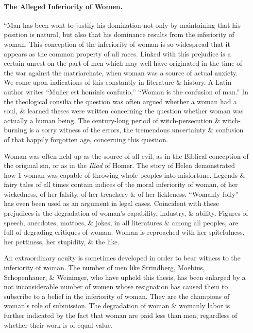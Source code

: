 \documentclass{article}
\begin{document}
\paragraph{The Alleged Inferiority of Women.} ``Man has been wont to justify his domination not only by maintaining that his position is natural, but also that his dominance results from the inferiority of woman. This conception of the inferiority of woman is so widespread that it appears as the common property of all races. Linked with this prejudice is a certain unrest on the part of men which may well have originated in the time of the war against the matriarchate, when woman was a source of actual anxiety. We come upon indications of this constantly in literature \& history. A Latin author writes ``Mulier est hominis confusio,'' ``Woman is the confusion of man.'' In the theological consilia the question was often argued whether a woman had a soul, \& learned theses were written concerning the question whether woman was actually a human being. The century-long period of witch-persecution \& witch-burning is a sorry witness of the errors, the tremendous uncertainty \& confusion of that happily forgotten age, concerning this question.

Woman was often held up as the source of all evil, as in the Biblical conception of the original sin, or as in the {\it Iliad} of Homer. The story of Helen demonstrated how 1 woman was capable of throwing whole peoples into misfortune. Legends \& fairy tales of all times contain indices of the moral inferiority of woman, of her wickedness, of her falsity, of her treachery \& of her fickleness. ``Womanly folly'' has even been used as an argument in legal cases. Coincident with these prejudices is the degradation of woman's capability, industry, \& ability. Figures of speech, anecdotes, mottoes, \& jokes, in all literatures \& among all peoples, are full of degrading critiques of woman. Woman is reproached with her spitefulness, her pettiness, her stupidity, \& the like.

An extraordinary acuity is sometimes developed in order to bear witness to the inferiority of woman. The number of men like Strindberg, Moebius, Schopenhauer, \& Weininger, who have upheld this thesis, has been enlarged by a not inconsiderable number of women whose resignation has caused them to subscribe to a belief in the inferiority of woman. They are the champions of woman's role of submission. The degradation of woman \& womanly labor is further indicated by the fact that woman are paid less than men, regardless of whether their work is of equal value.
\end{document}
